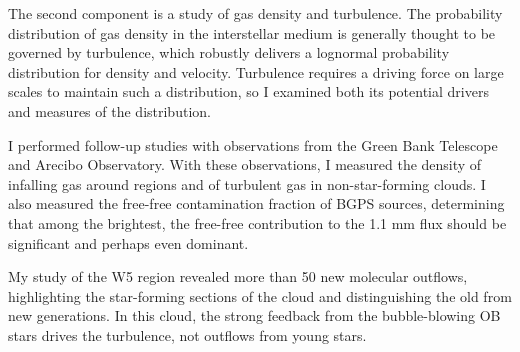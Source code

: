 The second component is a study of gas density and turbulence. The probability
distribution of gas density in the interstellar medium is generally thought to
be governed by turbulence, which robustly delivers a lognormal probability
distribution for density and velocity.  Turbulence requires a driving force on
large scales to maintain such a distribution, so I examined both its potential
drivers and measures of the distribution.

I performed follow-up studies with \formaldehyde observations from the Green
Bank Telescope and Arecibo Observatory.  With these observations, I measured
the density of infalling gas around \uchii regions and of turbulent gas in
non-star-forming clouds.  I also measured the free-free contamination fraction
of BGPS sources, determining that among the brightest, the free-free contribution
to the 1.1 mm flux should be significant and perhaps even dominant.

My study of the W5 region revealed more than 50 new molecular outflows,
highlighting the star-forming sections of the cloud and distinguishing the old
from new generations.  In this cloud, the strong feedback from the
bubble-blowing OB stars drives the turbulence, not outflows from young stars.




